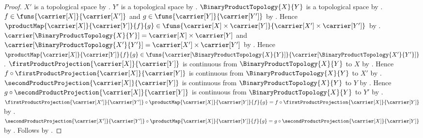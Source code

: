 \begin{proof}
    $X'$ is a topological space by .
    $Y'$ is a topological space by .
    $\BinaryProductTopology{X}{Y}$ is a topological space by
        .
    $f\in\funs{\carrier[X]}{\carrier[X']}$ and
        $g\in\funs{\carrier[Y]}{\carrier[Y']}$ by
        .
    Hence $\productMap{\carrier[X]}{\carrier[Y]}{f}{g}\in
        \funs{
            \carrier[X]\times\carrier[Y]}{
            \carrier[X']\times\carrier[Y']}$ by
        .
    $\carrier[\BinaryProductTopology{X}{Y}]
        =\carrier[X]\times\carrier[Y]$ and
        $\carrier[\BinaryProductTopology{X'}{Y'}]
        =\carrier[X']\times\carrier[Y']$ by
        .
    Hence $\productMap{\carrier[X]}{\carrier[Y]}{f}{g}\in
        \funs{
            \carrier[\BinaryProductTopology{X}{Y}]}{
            \carrier[\BinaryProductTopology{X'}{Y'}]}$.
    $\firstProductProjection{\carrier[X]}{\carrier[Y]}$ is continuous
        from $\BinaryProductTopology{X}{Y}$ to $X$ by
        .
    Hence $f\circ\firstProductProjection{
        \carrier[X]}{\carrier[Y]}$ is continuous from
        $\BinaryProductTopology{X}{Y}$ to $X'$ by
        .
    $\secondProductProjection{\carrier[X]}{\carrier[Y]}$ is continuous
        from $\BinaryProductTopology{X}{Y}$ to $Y$ by
        .
    Hence $g\circ\secondProductProjection{
        \carrier[X]}{\carrier[Y]}$ is continuous from
        $\BinaryProductTopology{X}{Y}$ to $Y'$ by
        .
    $\firstProductProjection{\carrier[X']}{\carrier[Y']}\circ
        \productMap{\carrier[X]}{\carrier[Y]}{f}{g}
        =f\circ\firstProductProjection{\carrier[X]}{\carrier[Y]}$ by
        .
    $\secondProductProjection{\carrier[X']}{\carrier[Y']}\circ
        \productMap{\carrier[X]}{\carrier[Y]}{f}{g}
        =g\circ\secondProductProjection{\carrier[X]}{\carrier[Y]}$ by
        .
    Follows by .
\end{proof}

